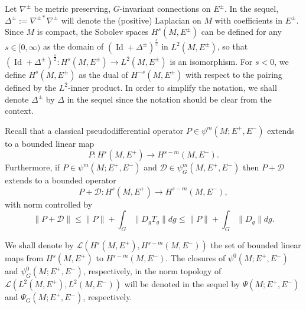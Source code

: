 \documentclass[11pt,a4paper]{amsart}
\newcommand{\maD}{\mathcal D}
\newcommand{\maL}{\mathcal L}
\newcommand\<{\langle}
\renewcommand\>{\rangle}
\newcommand{\oid}{\operatorname{Id}}
\theoremstyle{definition}
\begin{document}
Let $\nabla^\pm$ be  metric preserving, $G$-invariant connections on $E^\pm$. 
In the sequel, $\Delta^\pm := \nabla^{\pm *} \nabla^\pm$ will
denote the (positive) Laplacian on $M$ with coefficients
in $E^\pm$.  Since $M$ is compact, the Sobolev spaces $H^s(M, E^\pm)$ can be defined for any
$s \in [0,\infty)$ as the domain of $(\oid + \Delta^\pm)^{\frac{s}{2}}$ in $L^2(M, E^\pm)$, so that 
$(\oid + \Delta^\pm)^{\frac{s}{2}} : H^s(M, E^{\pm}) \rightarrow L^2(M, E^\pm)$ is
an isomorphism. For $s < 0$, we define $H^s(M, E^\pm)$ as the dual of $H^{-s}(M, E^\pm)$ with
respect to the pairing defined by the $L^2$-inner product. 
In order to simplify the notation, we shall denote $\Delta^\pm$ 
by $\Delta$ in the sequel 
since the notation should be clear from the context.

Recall that a  classical pseudodifferential operator
$P \in \psi^m(M;E^+,E^-)$ extends to a bounded linear map 
\begin{equation*}
P : H^{s}(M,E^+) \rightarrow H^{s-m}(M,E^-).
\end{equation*}
Furthermore, if $P \in \psi^m(M;E^+,E^-)$ and $\maD \in \psi^m_G(M,E^+,E^-)$ 
then $P+\maD$ extends to a bounded operator
\begin{equation}
P+\maD : H^s(M,E^+) \rightarrow H^{s-m}(M,E^-),
\end{equation}
with norm controlled by 
\begin{equation*}
\|P+\maD\| \leq \|P\| + \int_G \|D_g T_g\| dg \le \|P\| + \int_G \|D_g\| dg.
\end{equation*}

 


We shall denote by $\maL(H^s(M, E^+), H^{s-m}(M, E^-))$ the set of bounded linear maps 
from $ H^s(M, E^+)$ to $H^{s-m}(M, E^-)$. The closures of
$\psi^0(M; E^+,E^-)$ and $\psi^0_G(M; E^+,E^-)$, respectively, in the norm topology of
$\maL(L^2(M, E^+), L^2(M, E^-))$ 
will be denoted in the sequel by  
$\Psi(M;E^+,E^-)$ and  $\Psi_G(M;E^+,E^-)$, respectively.
\end{document}
